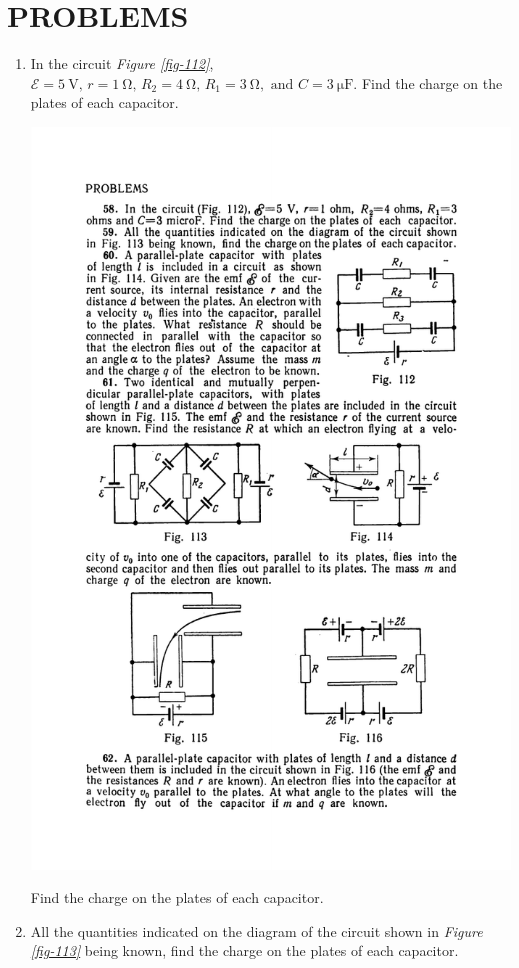 \documentclass[a4paper,sfsidenotes]{tufte-book}
\newcommand{\Ea}{\mathcal{E}}
\begin{document}
\section*{PROBLEMS}
\begin{enumerate}[resume=problems]
\item In the circuit \emph{Figure \ref{fig-112}}, $\Ea=\SI{5}{\volt}, \, r=\SI{1}{\ohm}, \, R_{2} = \SI{4}{\ohm},\, R_{1} =\SI{3}{\ohm},\,\, \text{and} \,\, C=\SI{3}{\micro \farad}$. Find the charge on the plates of each capacitor. 
\begin{marginfigure}[-9cm]
\centering
\includegraphics[width=0.8\linewidth]{fig-112a}
\caption{Find the charge on the plates of each capacitor.}
\label{fig-112}
\end{marginfigure}
\item All the quantities indicated on the diagram of the circuit shown in \emph{Figure \ref{fig-113}} being known, find the charge on the plates of each capacitor.
\begin{marginfigure}[-3cm]
\centering

\end{marginfigure}
\end{enumerate}
\end{document}
